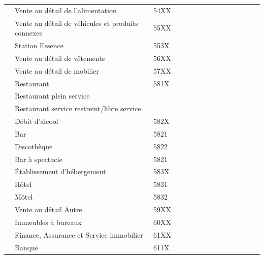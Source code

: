 \begin{landscape}
\begin{center}
\begin{longtable}{m{0.5cm} | p{2.5cm}  *{13}{|m{1.2cm}}|}
        & Vente au détail de l'alimentation & \hspace{3mm}54XX \\
        & Vente au détail de véhicules et produits connexes & \hspace{3mm}55XX \\
        & Station Essence & \hspace{6mm}553X\\
        & Vente au détail de vêtements & \hspace{3mm}56XX\\
        & Vente au détail de mobilier & \hspace{3mm}57XX\\
        & Restaurant & \hspace{6mm}581X\\
        & Restaurant plein service & \hspace{6mm}\\
        & Restaurant service restreint/libre service& \hspace{6mm}\\
        & Débit d'alcool & \hspace{6mm}582X\\
        & Bar & \hspace{6mm}5821\\
        & Discothèque & \hspace{6mm}5822\\
        & Bar à spectacle & \hspace{6mm}5821\\
        & Établissement d'hébergement & \hspace{6mm}583X\\
        & Hôtel & \hspace{9mm}5831\\
        & Môtel & \hspace{9mm}5832\\
        & Vente au détail Autre & \hspace{3mm}59XX\\
        & Immeubles à bureaux & \hspace{3mm}60XX\\
        & Finance, Assurance et Service immobilier & \hspace{3mm}61XX\\
        & Banque & \hspace{3mm}611X\\

\end{longtable}
\end{center}
\end{landscape}
